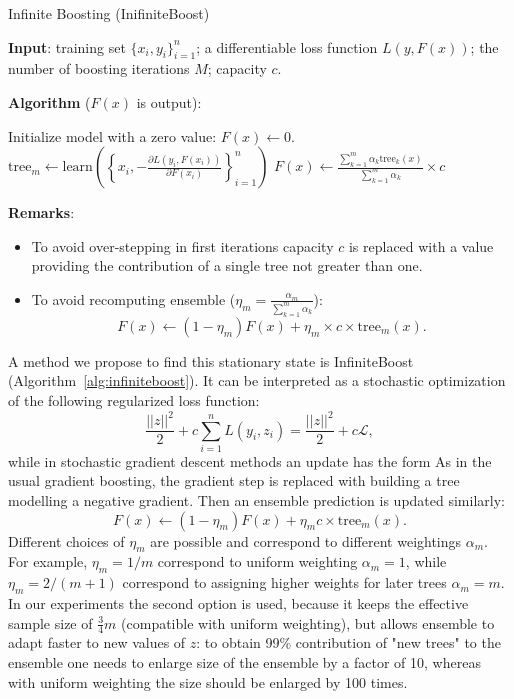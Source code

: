 \begin{algorithm}[!h]
  \caption{Infinite Boosting (InifiniteBoost)}\label{alg:infiniteboost}
  {\bf Input}: training set $\{x_i, y_i\}_{i=1}^n$; a differentiable loss function $L(y, F(x))$; the number of boosting iterations $M$; capacity $c$.

  {\bf Algorithm} ($F(x)$ is output):
  \begin{algorithmic}
    \State Initialize model with a zero value: $F(x) \gets 0$.
      \State $\text{tree}_m \gets \text{learn}\left(\left\{x_i, -\frac{\partial L(y_i, F(x_i))}{\partial F(x_i)}\right\}_{i=1}^n\right)$
      \State $F(x) \gets  \frac{\sum_{k=1}^m \alpha_k \text{tree}_k(x)}{\sum_{k=1}^m \alpha_k} \times c$
    \EndFor
  \end{algorithmic}

  {\bf Remarks}:
  \begin{itemize}
    \item To avoid over-stepping in first iterations capacity $c$ is replaced with a value providing the contribution of a single tree not greater than one.
    \item To avoid recomputing ensemble ($\eta_m = \frac{\alpha_m}{\sum_{k=1}^m \alpha_k}$):
      \begin{equation*}
        F(x) \gets (1-\eta_m)F(x) + \eta_m \times c \times \text{tree}_m(x).
      \end{equation*}
  \end{itemize}
\end{algorithm}
A method we propose to find this stationary state is InfiniteBoost (Algorithm~\ref{alg:infiniteboost}).
It can be interpreted as a stochastic optimization of the following regularized loss function:
\begin{equation*}
  \dfrac{|| z ||^2}{2} + c \sum_{i=1}^n L(y_i, z_i) = \dfrac{|| z ||^2}{2} + c \mathcal{L},
\end{equation*}
while in stochastic gradient descent methods an update has the form
As in the usual gradient boosting, the gradient step is replaced with building a tree modelling a negative gradient.
Then an ensemble prediction is updated similarly:
\begin{equation*}
    F(x) \leftarrow (1 - \eta_m) F(x) + \eta_m c \times \text{tree}_m(x).
\end{equation*}
Different choices of $\eta_m$ are possible and correspond to different weightings $\alpha_m$.
For example, $\eta_m = 1 / m$ correspond to uniform weighting $\alpha_m = 1$,
while $\eta_m = 2 / (m + 1)$ correspond to assigning higher weights for later trees $\alpha_m = m$.
In our experiments the second option is used, because it keeps the effective sample size of $\frac{3}{4}m$ (compatible with uniform weighting),
but allows ensemble to adapt faster to new values of $z$:
to obtain 99\% contribution of "new trees" to the ensemble one needs to enlarge size of the ensemble by a factor of 10,
whereas with uniform weighting the size should be enlarged by 100 times.

